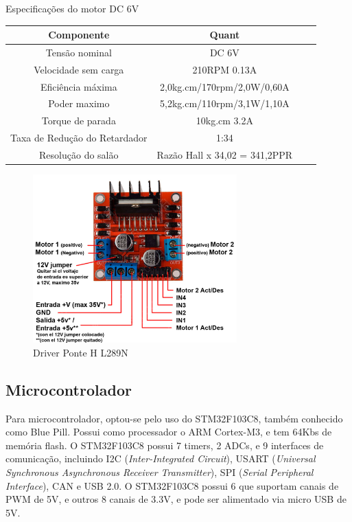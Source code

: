 \begin{quadro}[htb]
	\caption{\label{Especificacoes_motordc_6v}Especificações do motor DC 6V}
	 \begin{tabular}{|c|c|c|c|}
		\hline
		\textbf{Componente} & \textbf{Quant} \\ \hline
		Tensão nominal & DC 6V  \\ \hline
		Velocidade sem carga  & 210RPM 0.13A  \\ \hline
		Eficiência máxima & 2,0kg.cm/170rpm/2,0W/0,60A   \\ \hline
		Poder maximo & 5,2kg.cm/110rpm/3,1W/1,10A   \\ \hline
		Torque de parada  & 10kg.cm 3.2A    \\ \hline
		Taxa de Redução do Retardador & 1:34  \\ \hline
		Resolução do salão & Razão Hall x 34,02 = 341,2PPR  \\ \hline
	\end{tabular}
	\end{quadro}

\begin{figure}[h]
	\centering
	\includegraphics[width=0.7\textwidth]{figures/l289n}
	\caption{Driver Ponte H L289N \cite{l289n}}
\end{figure}

	
\subsection{Microcontrolador}

Para microcontrolador, optou-se pelo uso do  STM32F103C8, também conhecido como Blue Pill.
Possui como processador o ARM Cortex-M3, e tem 64Kbs de memória flash. 
O STM32F103C8 possui 7 timers, 2 ADCs, e 9 interfaces de comunicação, incluindo
I2C (\textit{Inter-Integrated Circuit}), USART (\textit{Universal Synchronous
Asynchronous Receiver Transmitter}), SPI (\textit{Serial Peripheral Interface}),
CAN e USB 2.0.
O STM32F103C8 possui 6 que suportam canais de PWM de 5V, e outros 8 canais de 3.3V,  e pode ser alimentado via micro USB de 5V.

